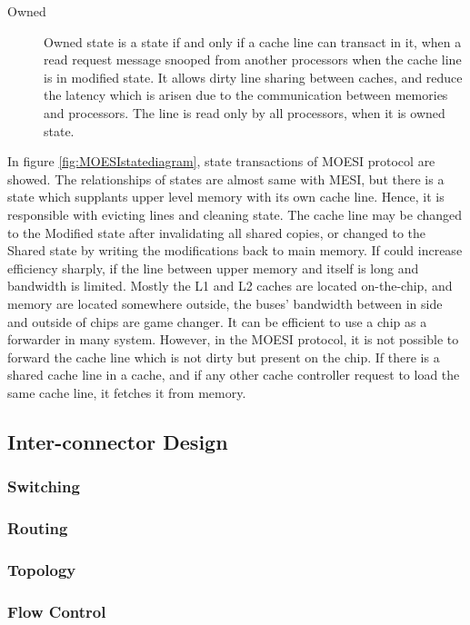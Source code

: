\documentclass[informationsecurity]{gucmasterproject}
\begin{document}
\begin{description}
\item[Owned] Owned state is a state if and only if a cache line can transact in it, when a read request message snooped from another processors when the cache line is in modified state. It allows dirty line sharing between caches, and reduce the latency which is arisen due to the communication between memories and processors. The line is read only by all processors, when it is owned state.
\end{description}

In figure \ref{fig:MOESIstatediagram}, state transactions of MOESI protocol are showed. The relationships of states are almost same with MESI, but there is a state which supplants upper level memory with its own cache line. Hence, it is responsible with evicting lines and cleaning state. The cache line may be changed to the Modified state after invalidating all shared copies, or changed to the Shared state by writing the modifications back to main memory. If could increase efficiency sharply, if the line between upper memory and itself is long and bandwidth is limited. Mostly the L1 and L2 caches are located on-the-chip, and memory are located somewhere outside, the buses' bandwidth between in side and outside of chips are game changer. It can be efficient to use a chip as a forwarder in many system. However, in the MOESI protocol, it is not possible to forward the cache line which is not dirty but present on the chip. If there is a shared cache line in a cache, and if any other cache controller request to load the same cache line, it fetches it from memory.


\subsection{Inter-connector Design}
\subsubsection{Switching}
\subsubsection{Routing}
\subsubsection{Topology}
\subsubsection{Flow Control}


\end{document}

